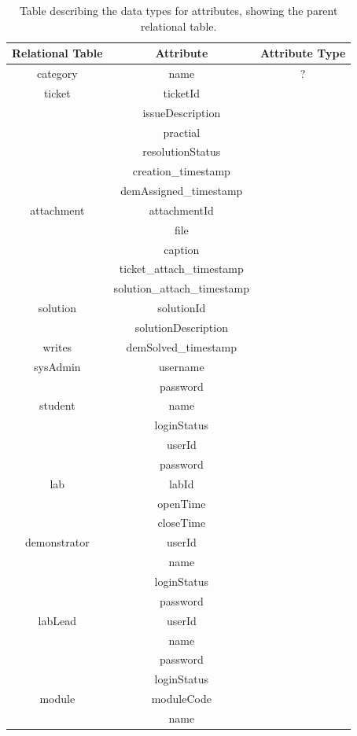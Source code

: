 \begin{table}[H]
\centering
\begin{tabular}{| c | c | c |}
\hline
 Relational Table & Attribute & Attribute Type \\ 
 \hline
  category & name & ? \\
  \hline
  ticket & ticketId & \\
  & issueDescription & \\
  & practial & \\
  & resolutionStatus & \\
  & creation\_timestamp & \\
  &  demAssigned\_timestamp & \\
  \hline 
  attachment & attachmentId & \\
  & file & \\
  & caption & \\
  & ticket\_attach\_timestamp & \\
  & solution\_attach\_timestamp & \\
  \hline
  solution & solutionId & \\
  & solutionDescription & \\
  \hline
  writes & demSolved\_timestamp & \\
  \hline
  sysAdmin & username & \\
  & password & \\
  \hline
  student & name & \\
  & loginStatus & \\
  & userId & \\
  & password & \\
  \hline
  lab & labId & \\
  & openTime & \\
  & closeTime & \\
  \hline
  demonstrator & userId & \\
  & name & \\
  & loginStatus & \\
  & password & \\
  \hline
  labLead & userId & \\
  & name & \\
  & password &  \\
  & loginStatus & \\
  \hline
  module & moduleCode & \\
  & name & \\
 \hline
 
 \hline
\end{tabular}
\caption{Table describing the data types for attributes, showing the parent relational table.}
\label{table:atypetable}
\end{table}

